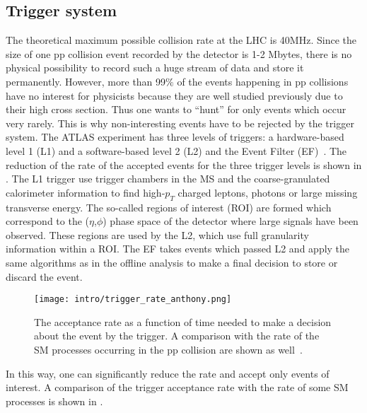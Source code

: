 \subsection{Trigger system}
The theoretical maximum possible collision rate at the LHC is 40MHz.
Since the size of one pp collision event recorded by the detector is 1-2 Mbytes, there is no physical possibility to record such a huge stream of data and store it permanently. However, more than 99$\%$ of the events happening in pp collisions have no interest for physicists because they are well studied previously due to their high cross section. Thus one wants to ``hunt'' for only events which occur very rarely. This is why non-interesting events have to be rejected by the trigger system.
The ATLAS experiment has three levels of triggers: a hardware-based level 1 (L1) and a software-based level 2 (L2) and the Event Filter (EF)~\cite{tdr_tdaq}.
The reduction of the rate of the accepted events for the three trigger levels is shown in .
The L1 trigger use trigger chambers in the MS and the coarse-granulated calorimeter information to find high-$p_T$ charged leptons, photons or large missing transverse energy. The so-called regions of interest (ROI) are formed which correspond to the ($\eta$,$\phi$) phase space of the detector where large signals have been observed. These regions are used by the L2, which use full granularity information within a ROI. The EF takes events which passed L2 and apply the same algorithms as in the offline analysis to make a final decision to store or discard the event.

\begin{figure}[h!]
\centering
 \texttt{[image: intro/trigger\_rate\_anthony.png]}
 \caption{The acceptance rate as a function of time needed to make a decision about the event by the trigger. A comparison with the rate of the SM processes occurring in the pp collision are shown as well~\cite{anthony_thesis}.}
\label{fig:trigger_rate}
\end{figure}

In this way, one can significantly reduce the rate and accept only events of interest. A comparison of the  trigger acceptance rate with the rate of some SM processes is shown in .


